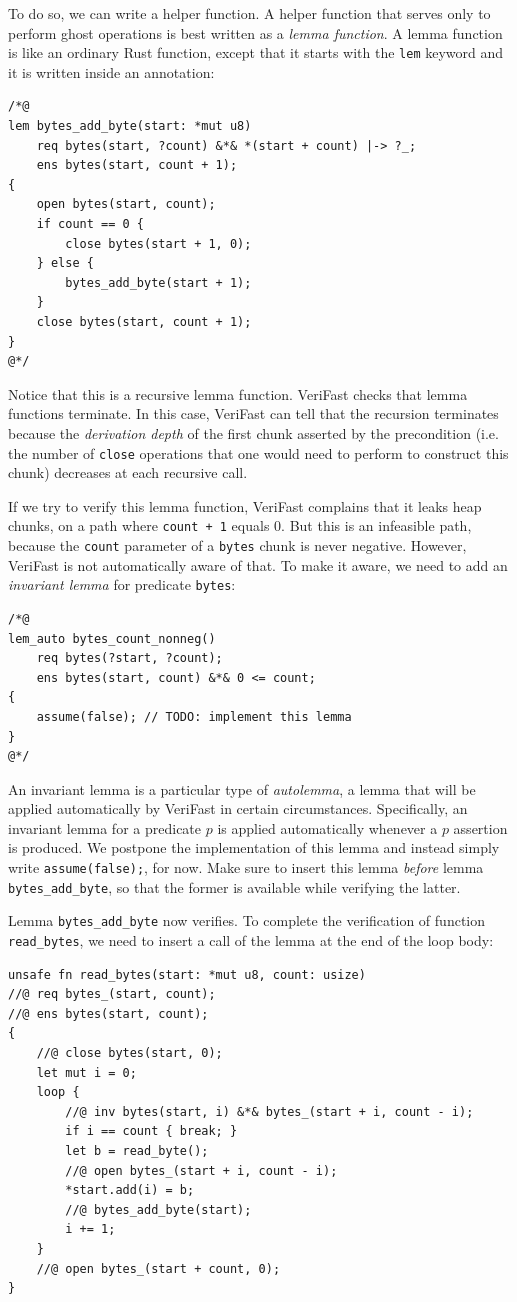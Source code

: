 \documentclass{article}
\begin{document}
To do so, we can write a helper function. A helper function that serves only to perform ghost operations is best written as a
\emph{lemma function}. A lemma function is like an ordinary Rust function, except that it starts with the \lstinline!lem! keyword and it is written
inside an annotation:
\begin{lstlisting}
/*@
lem bytes_add_byte(start: *mut u8)
    req bytes(start, ?count) &*& *(start + count) |-> ?_;
    ens bytes(start, count + 1);
{
    open bytes(start, count);
    if count == 0 {
        close bytes(start + 1, 0);
    } else {
        bytes_add_byte(start + 1);
    }
    close bytes(start, count + 1);
}
@*/
\end{lstlisting}
Notice that this is a recursive lemma function. VeriFast checks that lemma functions terminate. In this case, VeriFast can tell that the recursion terminates because the \emph{derivation depth} of the first chunk asserted by the precondition (i.e. the number of \lstinline|close| operations that one would need to perform to construct this chunk) decreases at each recursive call.

If we try to verify this lemma function, VeriFast complains that it leaks heap chunks, on a path where \lstinline|count + 1| equals 0. But this is an infeasible path, because the \lstinline|count| parameter of a \lstinline|bytes| chunk is never negative. However, VeriFast is not automatically aware of that. To make it aware, we need to add an \emph{invariant lemma} for predicate \lstinline|bytes|:
\begin{lstlisting}
/*@
lem_auto bytes_count_nonneg()
    req bytes(?start, ?count);
    ens bytes(start, count) &*& 0 <= count;
{
    assume(false); // TODO: implement this lemma
}
@*/
\end{lstlisting}
An invariant lemma is a particular type of \emph{autolemma}, a lemma that will be applied automatically by VeriFast in certain circumstances. Specifically, an invariant lemma for a predicate $p$ is applied automatically whenever a $p$ assertion is produced. We postpone the implementation of this lemma and instead simply write \lstinline|assume(false);|, for now.
Make sure to insert this lemma \emph{before} lemma \lstinline|bytes_add_byte|, so that the former is available while verifying the latter.

Lemma \lstinline|bytes_add_byte| now verifies. To complete the verification of function \lstinline|read_bytes|, we need to insert a call of the lemma at the end of the loop body:
\begin{lstlisting}
unsafe fn read_bytes(start: *mut u8, count: usize)
//@ req bytes_(start, count);
//@ ens bytes(start, count);
{
    //@ close bytes(start, 0);
    let mut i = 0;
    loop {
        //@ inv bytes(start, i) &*& bytes_(start + i, count - i);
        if i == count { break; }
        let b = read_byte();
        //@ open bytes_(start + i, count - i);
        *start.add(i) = b;
        //@ bytes_add_byte(start);
        i += 1;
    }
    //@ open bytes_(start + count, 0);
}
\end{lstlisting}
\end{document}
